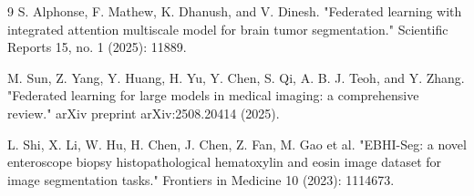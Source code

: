 \documentclass[conference]{IEEEtran}
\begin{document}
\begin{thebibliography}{9}
S. Alphonse, F. Mathew, K. Dhanush, and V. Dinesh. "Federated learning with integrated attention multiscale model for brain tumor segmentation." Scientific Reports 15, no. 1 (2025): 11889.

M. Sun, Z. Yang, Y. Huang, H. Yu, Y. Chen, S. Qi, A. B. J. Teoh, and Y. Zhang. "Federated learning for large models in medical imaging: a comprehensive review." arXiv preprint arXiv:2508.20414 (2025).

L. Shi, X. Li, W. Hu, H. Chen, J. Chen, Z. Fan, M. Gao et al. "EBHI-Seg: a novel enteroscope biopsy histopathological hematoxylin and eosin image dataset for image segmentation tasks." Frontiers in Medicine 10 (2023): 1114673.

\end{thebibliography}
\end{document}
